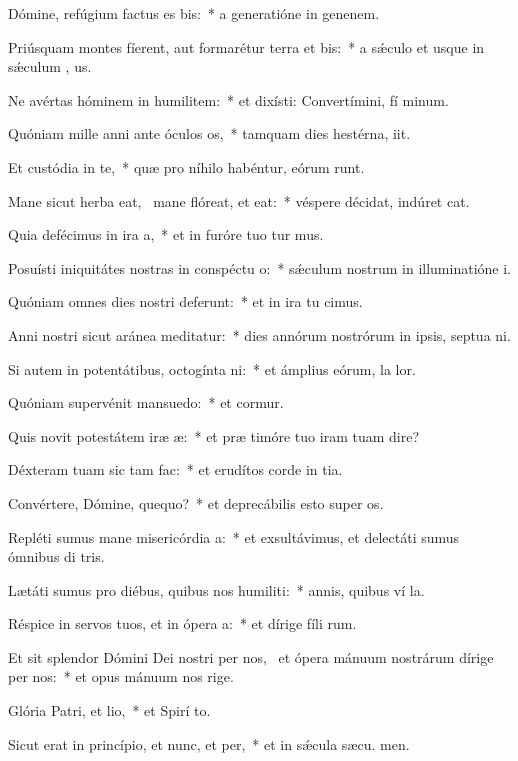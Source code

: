\item Dómine, refúgium factus es bis:~* a generatióne in genenem.
\item Priúsquam montes fíerent, aut formarétur terra et bis:~* a sǽculo et usque in sǽculum  , us.
\item Ne avértas hóminem in humilitem:~* et dixísti: Convertímini, fí minum.
\item Quóniam mille anni ante óculos os,~* tamquam dies hestérna,  iit.
\item Et custódia in te,~* quæ pro níhilo habéntur, eórum  runt.
\item Mane sicut herba eat,~\pscross{} mane flóreat, et eat:~* véspere décidat, indúret  cat.
\item Quia defécimus in ira a,~* et in furóre tuo tur mus.
\item Posuísti iniquitátes nostras in conspéctu o:~* sǽculum nostrum in illuminatióne  i.
\item Quóniam omnes dies nostri deferunt:~* et in ira tu cimus.
\item Anni nostri sicut aránea meditatur:~* dies annórum nostrórum in ipsis, septua ni.
\item Si autem in potentátibus, octogínta ni:~* et ámplius eórum, la  lor.
\item Quóniam supervénit mansuedo:~* et cormur.
\item Quis novit potestátem iræ æ:~* et præ timóre tuo iram tuam dire?
\item Déxteram tuam sic tam fac:~* et erudítos corde in tia.
\item Convértere, Dómine, quequo?~* et deprecábilis esto super  os.
\item Repléti sumus mane misericórdia a:~* et exsultávimus, et delectáti sumus ómnibus di tris.
\item Lætáti sumus pro diébus, quibus nos humiliti:~* annis, quibus ví la.
\item Réspice in servos tuos, et in ópera a:~* et dírige fíli rum.
\item Et sit splendor Dómini Dei nostri per nos,~\pscross{} et ópera mánuum nostrárum dírige per nos:~* et opus mánuum nos rige.
\item Glória Patri, et lio,~* et Spirí to.
\item Sicut erat in princípio, et nunc, et per,~* et in sǽcula sæcu. men.
